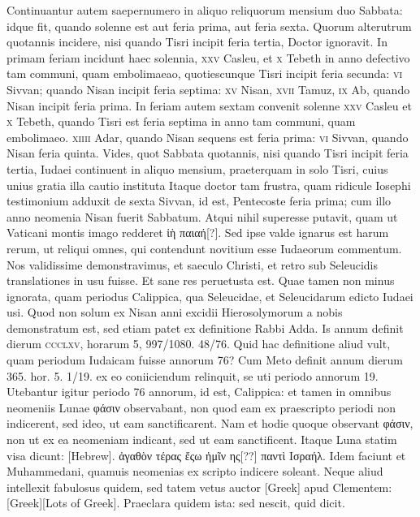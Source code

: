 \begin{parnumbers}
Continuantur autem saepernumero in aliquo reliquorum mensium
duo Sabbata: idque fit, quando solenne est aut feria prima, aut feria
sexta.
Quorum alterutrum quotannis incidere, nisi quando Tisri
incipit feria tertia, Doctor ignoravit.
In primam feriam incidunt
haec solennia, \textsc{xxv} Casleu, et \textsc{x} Tebeth in anno defectivo tam
communi, quam embolimaeao, quotiescunque Tisri incipit feria secunda:
\textsc{vi} Sivvan; quando Nisan incipit feria septima:
\textsc{xv} Nisan, \textsc{xvii} Tamuz,
\textsc{ix} Ab, quando Nisan incipit feria prima.
In feriam autem sextam
convenit solenne \textsc{xxv} Casleu et
 \textsc{x} Tebeth, quando Tisri est feria
septima in anno tam communi, quam embolimaeo.
\textsc{xiiii} Adar, quando
Nisan sequens est feria prima: \textsc{vi} Sivvan, quando Nisan feria quinta.
Vides, quot Sabbata quotannis, nisi quando Tisri incipit
 feria tertia, Iudaei
continuent in aliquo mensium, praeterquam in solo Tisri, cuius
unius gratia illa cautio instituta
Itaque doctor tam frustra, quam ridicule
Iosephi testimonium adduxit de sexta Sivvan, id est, Pentecoste
feria prima; cum illo anno neomenia Nisan fuerit Sabbatum.
Atqui
nihil superesse putavit, quam ut Vaticani montis imago redderet
\textgreek{ἰὴ παιαή[?]}.
Sed ipse valde ignarus est harum rerum, ut reliqui omnes,
qui contendunt novitium esse Iudaeorum commentum.
Nos
validissime demonstravimus, et saeculo Christi, et retro sub Seleucidis
translationes in usu fuisse.
Et sane res peruetusta est.
Quae tamen
non minus ignorata, quam periodus Calippica, qua Seleucidae, et
Seleucidarum edicto Iudaei usi.
Quod non solum ex Nisan anni excidii
Hierosolymorum a nobis demonstratum est, sed etiam patet
ex definitione Rabbi Adda.
Is annum definit dierum \textsc{ccclxv},
horarum 5, 997/1080. 48/76.
Quid hac definitione aliud vult, quam periodum
Iudaicam fuisse annorum 76?
Cum Meto definit annum dierum
365. hor. 5. 1/19. ex eo coniiciendum relinquit, se uti periodo annorum
19.
Utebantur igitur periodo 76 annorum, id est, Calippica:
et tamen in omnibus neomeniis Lunae \textgreek{φάσιν} observabant, non
quod eam ex praescripto periodi non indicerent, sed ideo, ut eam
sanctificarent.
Nam et hodie quoque observant \textgreek{φάσιν}, non ut ex ea
neomeniam indicant, sed ut eam sanctificent.
Itaque Luna statim
visa dicunt: \texthebrew{[Hebrew]}.
\textgreek{ἀγαθὸν τέρας ἔςω ἡμῖν ης[??] παντὶ Ισραήλ.}
Idem faciunt et Muhammedani, quamuis neomenias ex
scripto indicere soleant.
Neque aliud intellexit fabulosus quidem,
sed tatem vetus auctor \textgreek{[Greek]} apud Clementem:
\textgreek{[Greek][Lots of Greek]}.
{}
Praeclara quidem ista: sed nescit, quid dicit.


\end{parnumbers}
